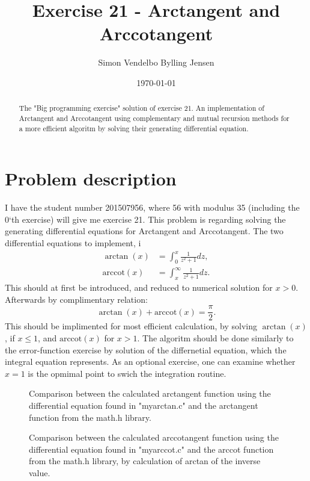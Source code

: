 \documentclass[twocolumn]{article}
\begin{document}
\title{Exercise 21 - Arctangent and Arccotangent}
\author{Simon Vendelbo Bylling Jensen}
\date{\today}
\maketitle

\begin{abstract}
The "Big programming exercise" solution of exercise 21. An implementation of Arctangent and Arccotangent using complementary and mutual recursion methods for a more efficient algoritm by solving their generating differential equation. 
\end{abstract}

\section{Problem description}
I have the student number 201507956, where 56 with modulus 35 (including the 0`th exercise) will give me exercise 21. This problem is regarding solving the generating differential equations for Arctangent and Arccotangent. The two differential equations to implement, i
\begin{align}
\arctan(x) &= \int_0^x \frac{1}{z^2 + 1} dz, \label{eq:arctan}\\
\mathrm{arccot}(x) &= \int_x^\infty \frac{1}{z^2 + 1} dz. \label{eq:arccot} 
\end{align}
This should at first be introduced, and reduced to numerical solution for $x > 0$. Afterwards by complimentary relation:
\begin{equation}
\arctan(x) + \mathrm{arccot}(x) = \frac{\pi}{2}.\label{eq:sumrelation}
\end{equation}
This should be implimented for most efficient calculation, by solving $\arctan(x)$, if $x \leq 1$, and $\mathrm{arccot}(x)$ for $x>1$. The algoritm should be done similarly to the error-function exercise by solution of the differnetial equation, which the integral equation represents. As an optional exercise, one can examine whether $x=1$ is the opmimal point to swich the integration routine.


\begin{figure}

\caption{Comparison between the calculated arctangent function using the differential equation found in "myarctan.c" and the arctangent function from the math.h library.}
\label{fig-atan}
\end{figure}

\begin{figure}

\caption{Comparison between the calculated arccotangent function using the differential equation found in "myarccot.c" and the arccot function from the math.h library, by calculation of arctan of the inverse value.}
\label{fig-acot}
\end{figure}
\end{document}
